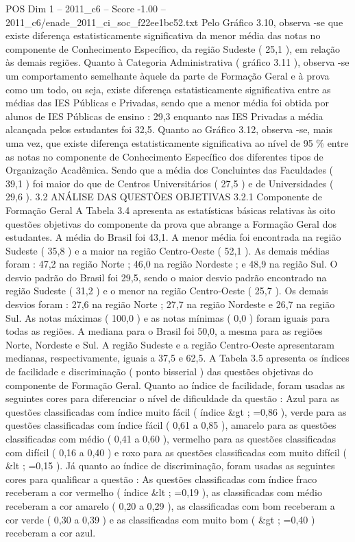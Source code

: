\begin{textsample}{POS Dim 1 – 2011\_c6 – Score -1.00 – 2011\_c6/enade\_2011\_ci\_soc\_f22ee1bc52.txt}
Pelo Gráfico 3.10, observa -se que existe diferença estatisticamente significativa da menor média das notas no componente de Conhecimento Específico, da região Sudeste ( 25,1 ), em relação às demais regiões.
Quanto à Categoria Administrativa ( gráfico 3.11 ), observa -se um comportamento semelhante àquele da parte de Formação Geral e à prova como um todo, ou seja, existe diferença estatisticamente significativa entre as médias das IES Públicas e Privadas, sendo que a menor média foi obtida por alunos de IES Públicas de ensino : 29,3 enquanto nas IES Privadas a média alcançada pelos estudantes foi 32,5.
Quanto ao Gráfico 3.12, observa -se, mais uma vez, que existe diferença estatisticamente significativa ao nível de 95 \% entre as notas no componente de Conhecimento Específico dos diferentes tipos de Organização Acadêmica.
Sendo que a média dos Concluintes das Faculdades ( 39,1 ) foi maior do que de Centros Universitários ( 27,5 ) e de Universidades ( 29,6 ). 3.2 ANÁLISE DAS QUESTÕES OBJETIVAS 3.2.1 Componente de Formação Geral A Tabela 3.4 apresenta as estatísticas básicas relativas às oito questões objetivas do componente da prova que abrange a Formação Geral dos estudantes.
A média do Brasil foi 43,1.
A menor média foi encontrada na região Sudeste ( 35,8 ) e a maior na região Centro-Oeste ( 52,1 ).
As demais médias foram : 47,2 na região Norte ; 46,0 na região Nordeste ; e 48,9 na região Sul.
O desvio padrão do Brasil foi 29,5, sendo o maior desvio padrão encontrado na região Sudeste ( 31,2 ) e o menor na região Centro-Oeste ( 25,7 ).
Os demais desvios foram : 27,6 na região Norte ; 27,7 na região Nordeste e 26,7 na região Sul.
As notas máximas ( 100,0 ) e as notas mínimas ( 0,0 ) foram iguais para todas as regiões.
A mediana para o Brasil foi 50,0, a mesma para as regiões Norte, Nordeste e Sul.
A região Sudeste e a região Centro-Oeste apresentaram medianas, respectivamente, iguais a 37,5 e 62,5.
A Tabela 3.5 apresenta os índices de facilidade e discriminação ( ponto bisserial ) das questões objetivas do componente de Formação Geral.
Quanto ao índice de facilidade, foram usadas as seguintes cores para diferenciar o nível de dificuldade da questão : Azul para as questões classificadas com índice muito fácil ( índice \&gt ; =0,86 ), verde para as questões classificadas com índice fácil ( 0,61 a 0,85 ), amarelo para as questões classificadas com médio ( 0,41 a 0,60 ), vermelho para as questões classificadas com difícil ( 0,16 a 0,40 ) e roxo para as questões classificadas com muito difícil ( \&lt ; =0,15 ).
Já quanto ao índice de discriminação, foram usadas as seguintes cores para qualificar a questão : As questões classificadas com índice fraco receberam a cor vermelho ( índice \&lt ; =0,19 ), as classificadas com médio receberam a cor amarelo ( 0,20 a 0,29 ), as classificadas com bom receberam a cor verde ( 0,30 a 0,39 ) e as classificadas com muito bom ( \&gt ; =0,40 ) receberam a cor azul.

\end{textsample}
